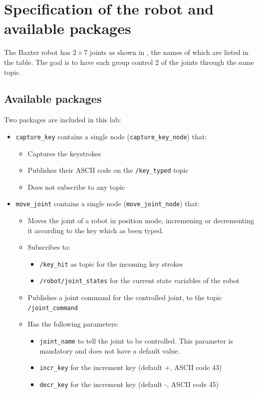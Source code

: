 \documentclass{ecnreport}
\begin{document}
\section{Specification of the robot and available packages}

The Baxter robot has $2\times 7$ joints as shown in , the names of which are listed in the table.
The goal is to have each group control 2 of the joints through the same topic.

\subsection{Available packages}

Two packages are included in this lab:
\begin{itemize}
 \item \texttt{capture\_key} contains a single node (\texttt{capture\_key\_node}) that:
 \begin{itemize}
  \item Captures the keystrokes
  \item Publishes their ASCII code on the \texttt{/key\_typed} topic
  \item Does not subscribe to any topic
 \end{itemize}
 \item \texttt{move\_joint} contains a single node (\texttt{move\_joint\_node}) that:
 \begin{itemize}
  \item Moves the joint of a robot in position mode, incremening or decrementing it according to the key which as been typed.
  \item Subscribes to:
  \begin{itemize}
   \item \texttt{/key\_hit} as topic for the incoming key strokes
   \item \texttt{/robot/joint\_states} for the current state variables of the robot
  \end{itemize}
  \item Publishes a joint command for the controlled joint, to the topic \texttt{/joint\_command}
  \item Has the following parameters:
  \begin{itemize}
   \item \texttt{joint\_name} to tell the joint to be controlled. This parameter is mandatory and does not have a default value.
   \item \texttt{incr\_key} for the increment key (default +, ASCII code 43)
   \item \texttt{decr\_key} for the increment key (default -, ASCII code 45)
  \end{itemize}
 \end{itemize}

\end{itemize}
\end{document}
